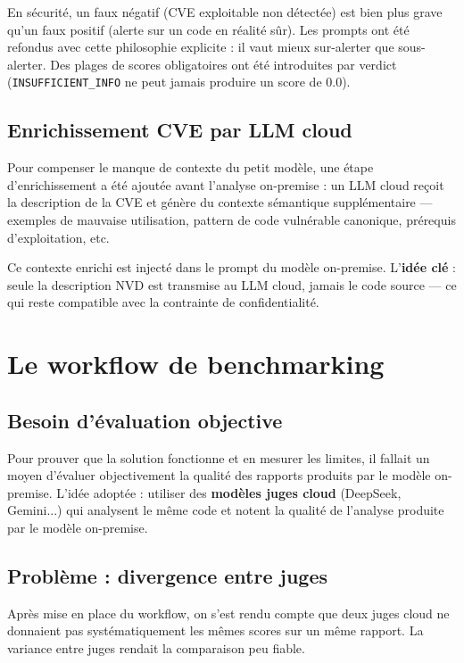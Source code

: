 \documentclass[a4paper, 12pt, hidelinks]{article}
\begin{document}
En sécurité, un faux négatif (CVE exploitable non détectée) est bien plus grave qu'un faux positif (alerte sur un code en réalité sûr). Les prompts ont été refondus avec cette philosophie explicite : il vaut mieux sur-alerter que sous-alerter. Des plages de scores obligatoires ont été introduites par verdict (\texttt{INSUFFICIENT\_INFO} ne peut jamais produire un score de 0.0).

\subsection*{Enrichissement CVE par LLM cloud}

Pour compenser le manque de contexte du petit modèle, une étape d'enrichissement a été ajoutée avant l'analyse on-premise : un LLM cloud reçoit la description de la CVE et génère du contexte sémantique supplémentaire — exemples de mauvaise utilisation, pattern de code vulnérable canonique, prérequis d'exploitation, etc.

Ce contexte enrichi est injecté dans le prompt du modèle on-premise. L'\textbf{idée clé} : seule la description NVD est transmise au LLM cloud, jamais le code source — ce qui reste compatible avec la contrainte de confidentialité.

\section{Le workflow de benchmarking}

\subsection*{Besoin d'évaluation objective}

Pour prouver que la solution fonctionne et en mesurer les limites, il fallait un moyen d'évaluer objectivement la qualité des rapports produits par le modèle on-premise. L'idée adoptée : utiliser des \textbf{modèles juges cloud} (DeepSeek, Gemini...) qui analysent le même code et notent la qualité de l'analyse produite par le modèle on-premise.

\subsection*{Problème : divergence entre juges}

Après mise en place du workflow, on s'est rendu compte que deux juges cloud ne donnaient pas systématiquement les mêmes scores sur un même rapport. La variance entre juges rendait la comparaison peu fiable.
\end{document}
